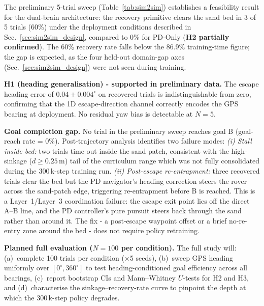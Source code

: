 \documentclass[conference]{IEEEtran}
\begin{document}
The preliminary 5-trial sweep (Table~\ref{tab:sim2sim}) establishes a feasibility
result for the dual-brain architecture: the recovery primitive clears the sand
bed in 3 of 5 trials (60\%) under the deployment conditions described in
Sec.~\ref{sec:sim2sim_design}, compared to 0\% for PD-Only (\textbf{H2
partially confirmed}). The 60\% recovery rate falls below the 86.9\%
training-time figure; the gap is expected, as the four held-out domain-gap axes
(Sec.~\ref{sec:sim2sim_design}) were not seen during training.

\textbf{H1 (heading generalisation) - supported in preliminary data.}
The escape heading error of $0.04\pm 0.004^\circ$ on recovered trials is
indistinguishable from zero, confirming that the 1D escape-direction channel
correctly encodes the GPS bearing at deployment. No residual yaw bias is
detectable at $N=5$.

\textbf{Goal completion gap.}
No trial in the preliminary sweep reaches goal B (goal-reach rate = 0\%).
Post-trajectory analysis identifies two failure modes:
\emph{(i) Stall inside bed:} two trials time out inside the sand patch,
consistent with the high-sinkage ($d \geq 0.25$\,m) tail of the curriculum
range which was not fully consolidated during the 300\,k-step training run.
\emph{(ii) Post-escape re-entrapment:} three recovered trials clear the bed
but the PD navigator's heading correction steers the rover across the
sand-patch edge, triggering re-entrapment before B is reached. This is a
Layer~1/Layer~3 coordination failure: the escape exit point lies off the
direct A--B line, and the PD controller's pure pursuit steers back through
the sand rather than around it. The fix - a post-escape waypoint offset or
a brief no-re-entry zone around the bed - does not require policy retraining.

\textbf{Planned full evaluation ($N=100$ per condition).}
The full study will: (a)~complete 100 trials per condition ($\times$5 seeds),
(b)~sweep GPS heading uniformly over $[0^\circ,360^\circ]$ to test
heading-conditioned goal efficiency across all bearings,
(c)~report bootstrap CIs and Mann--Whitney $U$-tests for H2 and H3,
and (d)~characterise the sinkage--recovery-rate curve to pinpoint
the depth at which the 300\,k-step policy degrades.
\end{document}
